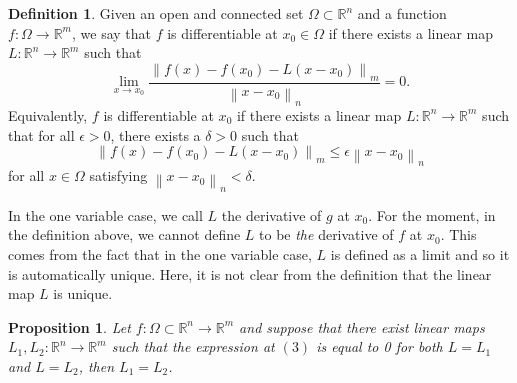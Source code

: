 \documentclass{article}
\theoremstyle{plain}
\newtheorem{proposition}[theorem]{Proposition}
\theoremstyle{definition}
\newtheorem*{definition}{Definition}
\newcommand{\R}{\mathbb{R}}
\newcommand{\lnorm}[2]{\left\lVert#2 \right\rVert_{#1}}
\begin{document}
\begin{definition}
    Given an open and connected set $\Omega \subset \R^n$ and a function $f : \Omega \to \R^m$, we say that $f$ is differentiable at $x_0 \in \Omega$ if there exists a linear map $L : \R^n \to \R^m$ such that 
    $$\lim_{x \rightarrow x_0}\frac{\lnorm{m}{f(x) - f(x_0) - L(x - x_0)}}{\lnorm{n}{x - x_0}} = 0.$$
    Equivalently, $f$ is differentiable at $x_0$ if there exists a linear map $L : \R^n \to \R^m$ such that for all $\epsilon > 0$, there exists a $\delta > 0$ such that 
    $$\lnorm{m}{f(x) - f(x_0) - L(x - x_0)} \leq \epsilon \lnorm{n}{x - x_0}$$
    for all $x \in \Omega$ satisfying $\lnorm{n}{x - x_0} < \delta$.
\end{definition}

In the one variable case, we call $L$ the derivative of $g$ at $x_0$. For the moment, in the definition above, we cannot define $L$ to be \textit{the} derivative of $f$ at $x_0$. This comes from the fact that in the one variable case, $L$ is defined as a limit and so it is automatically unique. Here, it is not clear from the definition that the linear map $L$ is unique.

\begin{proposition}
    Let $f : \Omega \subset \R^n \to \R^m$ and suppose that there exist linear maps $L_1, L_2 : \R^n \to \R^m$ such that the expression at $(3)$ is equal to 0 for both $L = L_1$ and $L = L_2$, then $L_1 = L_2$.
\end{proposition}
\end{document}
